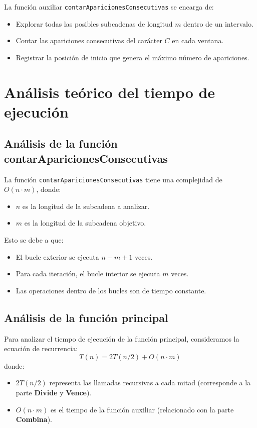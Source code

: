 \documentclass[12pt,a4paper]{article}
\begin{document}
La función auxiliar \texttt{contarAparicionesConsecutivas} se encarga de:
\begin{itemize}
    \item Explorar todas las posibles subcadenas de longitud \( m \) dentro de un intervalo.
    \item Contar las apariciones consecutivas del carácter \( C \) en cada ventana.
    \item Registrar la posición de inicio que genera el máximo número de apariciones.
\end{itemize}

\section{Análisis teórico del tiempo de ejecución}

\subsection{Análisis de la función contarAparicionesConsecutivas}
La función \texttt{contarAparicionesConsecutivas} tiene una complejidad de \(O(n \cdot m)\), donde:
\begin{itemize}
    \item \( n \) es la longitud de la subcadena a analizar.
    \item \( m \) es la longitud de la subcadena objetivo.
\end{itemize}
Esto se debe a que:
\begin{itemize}
    \item El bucle exterior se ejecuta \( n-m+1 \) veces.
    \item Para cada iteración, el bucle interior se ejecuta \( m \) veces.
    \item Las operaciones dentro de los bucles son de tiempo constante.
\end{itemize}

\subsection{Análisis de la función principal}
Para analizar el tiempo de ejecución de la función principal, consideramos la ecuación de recurrencia:
\[
T(n) = 2T(n/2) + O(n \cdot m)
\]
donde:
\begin{itemize}
    \item \(2T(n/2)\) representa las llamadas recursivas a cada mitad (corresponde a la parte \textbf{Divide} y \textbf{Vence}).
    \item \(O(n \cdot m)\) es el tiempo de la función auxiliar (relacionado con la parte \textbf{Combina}).
\end{itemize}
\end{document}
